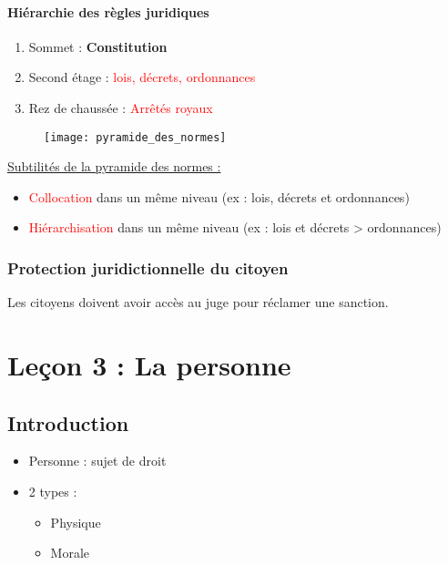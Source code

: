 \subsubsection{Hiérarchie des règles juridiques}

\begin{enumerate}
\item Sommet : \textbf{Constitution}
\item Second étage : \textcolor{red}{lois, décrets, ordonnances}
\item Rez de chaussée : \textcolor{red}{Arrêtés royaux}
\end{enumerate}

\begin{figure}[H]
    \texttt{[image: pyramide\_des\_normes]}
    \centering
\end{figure}

\underline{Subtilités de la pyramide des normes :}
\begin{itemize}
\item \textcolor{red}{Collocation} dans un même niveau (ex : lois, décrets et ordonnances)
\item \textcolor{red}{Hiérarchisation} dans un même niveau (ex : lois et décrets > ordonnances)
\end{itemize}

\subsection{Protection juridictionnelle du citoyen}
Les citoyens doivent avoir accès au juge pour réclamer une sanction.

\newpage
\chapter{Leçon 3 : La personne}

\section{Introduction}

\begin{itemize}
    \item Personne : sujet de droit
    \item 2 types :
    \begin{itemize}
        \item Physique
        \item Morale
    \end{itemize}
\end{itemize}

